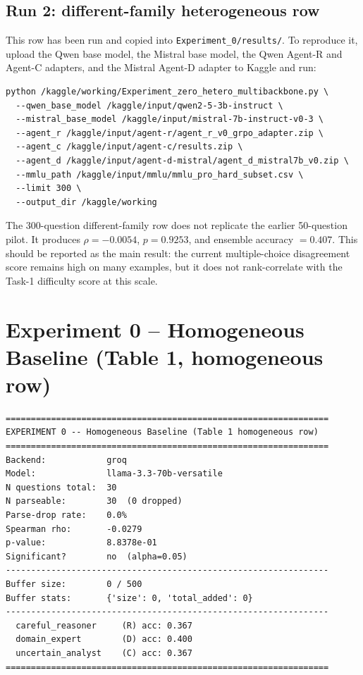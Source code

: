 \documentclass{article}
\begin{document}
\subsection{Run 2: different-family heterogeneous row}

This row has been run and copied into \texttt{Experiment\_0/results/}. To
reproduce it, upload the Qwen base model, the Mistral base model, the Qwen
Agent-R and Agent-C adapters, and the Mistral Agent-D adapter to Kaggle and
run:

\begin{verbatim}
python /kaggle/working/Experiment_zero_hetero_multibackbone.py \
  --qwen_base_model /kaggle/input/qwen2-5-3b-instruct \
  --mistral_base_model /kaggle/input/mistral-7b-instruct-v0-3 \
  --agent_r /kaggle/input/agent-r/agent_r_v0_grpo_adapter.zip \
  --agent_c /kaggle/input/agent-c/results.zip \
  --agent_d /kaggle/input/agent-d-mistral/agent_d_mistral7b_v0.zip \
  --mmlu_path /kaggle/input/mmlu/mmlu_pro_hard_subset.csv \
  --limit 300 \
  --output_dir /kaggle/working
\end{verbatim}

The 300-question different-family row does not replicate the earlier
50-question pilot. It produces \(\rho=-0.0054\), \(p=0.9253\), and ensemble
accuracy \(=0.407\). This should be reported as the main result: the current
multiple-choice disagreement score remains high on many examples, but it does
not rank-correlate with the Task-1 difficulty score at this scale.
\section*{Experiment 0 -- Homogeneous Baseline (Table 1, homogeneous row)}

\begin{verbatim}
================================================================
EXPERIMENT 0 -- Homogeneous Baseline (Table 1 homogeneous row)
================================================================
Backend:            groq
Model:              llama-3.3-70b-versatile
N questions total:  30
N parseable:        30  (0 dropped)
Parse-drop rate:    0.0%
Spearman rho:       -0.0279
p-value:            8.8378e-01
Significant?        no  (alpha=0.05)
----------------------------------------------------------------
Buffer size:        0 / 500
Buffer stats:       {'size': 0, 'total_added': 0}
----------------------------------------------------------------
  careful_reasoner     (R) acc: 0.367
  domain_expert        (D) acc: 0.400
  uncertain_analyst    (C) acc: 0.367
================================================================
\end{verbatim}
\end{document}
